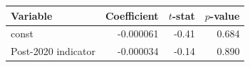 \begin{tabular}{lrrr}
\toprule
Variable & Coefficient & $t$-stat & $p$-value \\
\midrule
const & -0.000061 & -0.41 & 0.684 \\
Post-2020 indicator & -0.000034 & -0.14 & 0.890 \\
\bottomrule
\end{tabular}